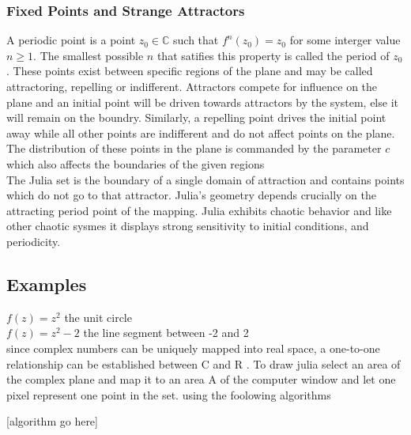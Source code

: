 \documentclass[12pt]{article}
\begin{document}
{\subsubsection{Fixed Points and Strange Attractors}
A periodic point is a point $z_0 \in \mathbb{C}$ such that $f^{n}(z_0) = z_0$ for some interger value $n \ge 1$. \cite{tokyo} The smallest possible $n$ that satifies this property is called the period of $z_0$.  These points exist between specific regions of the plane and may be called attractoring, repelling or indifferent. \cite{beauty} \cite{tokyo} Attractors compete for influence on the plane and an initial point will be driven towards attractors by the system, else it will remain on the boundry. Similarly, a repelling point drives the initial point away while all other points are indifferent and do not affect points on the plane. The distribution of these points in the plane is commanded by the parameter $c$ which also affects the boundaries of the given regions \cite{beauty}\\

The Julia set is the boundary of a single domain of attraction and contains points which do not go to that attractor. \cite{beauty} Julia's geometry depends crucially on the attracting period point of the mapping. \cite{yang} Julia exhibits chaotic behavior \cite{hypertext} and like other chaotic sysmes \cite{goodwin} it displays strong sensitivity to initial conditions, and periodicity.

\subsection{Examples}
$f(z) = z^{2}$ \: \: \: \: \: the unit circle \cite{Fassett} \\
$f(z) = z^{2}-2$ \: \: the line segment between -2 and 2 \\

since complex numbers can be uniquely mapped into real space,  a one-to-one relationship can be established between C and R \cite{china}. To draw julia select an area of the complex plane and map it to an area A of the computer window and let one pixel represent one point in the set. \cite{china} using the foolowing algorithms

[algorithm go here]


}
\end{document}
